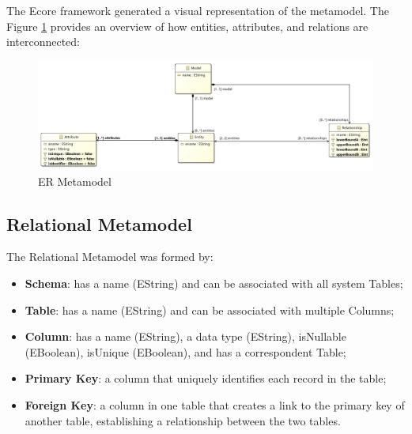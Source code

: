 \documentclass[10pt]{article}
\begin{document}
The Ecore framework generated a visual representation of the metamodel. The Figure \ref{figure3} provides an overview of how entities, attributes, and relations are interconnected:

\begin{center}
    \begin{figure}[H]
        \centering
        \includegraphics[width=1.0\textwidth]{imgs/er-metamodel.jpeg}
            \caption{ER Metamodel}
        \label{figure3}
    \end{figure}
\end{center}

\subsection{Relational Metamodel}

The Relational Metamodel was formed by:

\begin{itemize}

    \item \textbf{Schema}: has a name (EString) and can be associated with all system Tables;
 
    \item \textbf{Table}: has a name (EString) and can be associated with multiple Columns;
    
    \item \textbf{Column}: has a name (EString), a data type (EString), isNullable (EBoolean), isUnique (EBoolean), and has a correspondent Table;
    
    \item \textbf{Primary Key}: a column that uniquely identifies each record in the table;
    
    \item \textbf{Foreign Key}: a column in one table that creates a link to the primary key of another table, establishing a relationship between the two tables.
    
\end{itemize}
\end{document}

